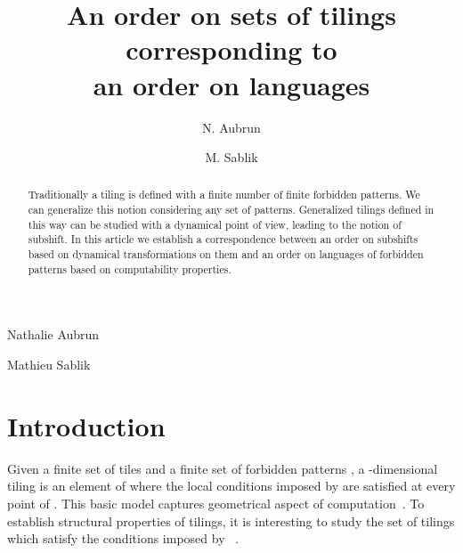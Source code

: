 \documentclass[proceedings]{stacs}
\theoremstyle{plain}\newtheorem{satz}[thm]{Satz}
\theoremstyle{definition}\newtheorem{crucial}[thm]{Crucial Definition}
\begin{document}
\title[An order on sets of tilings corresponding to an order on languages]{An order on sets of tilings corresponding to \\ an order on languages}

\author[lab1]{N. Aubrun}{Nathalie Aubrun}
\address[lab1]{Institut Gaspard Monge, Universit\'e Paris-Est Marne-la-Vall\'ee,
	 Marne-la-Vallée Cedex 2, France.}    

\author[lab2]{M. Sablik}{Mathieu Sablik}
\address[lab2]{ Laboratoire d'Analyse, Topologie, Probabilit\'e, Universit\'e de Provence,
	, rue F. Joliot Curie, 13453 Marseille Cedex 13, France.}	  








\begin{abstract}
Traditionally a tiling is defined with a finite number of finite forbidden patterns. We can generalize this notion considering any set of patterns. Generalized tilings defined in this way can be studied with a dynamical point of view, leading to the notion of subshift. In this article we establish a correspondence between an order on subshifts based on dynamical transformations on them and an order on languages of forbidden patterns based on computability properties.

\end{abstract}

\maketitle



\vspace{-0,4cm}

\section*{Introduction}\label{S:one}

Given a finite set of tiles  and a finite set of forbidden patterns , a -dimensional tiling is an element of  where the local conditions imposed by  are satisfied at every point of . This basic model captures geometrical aspect of computation~\cite{berger1966udp,robinson1971uan,Myers1974}. To establish structural properties of tilings, it is interesting to study the set of tilings which satisfy the conditions imposed by ~\cite{ballierstacs2008}. 
\end{document}
